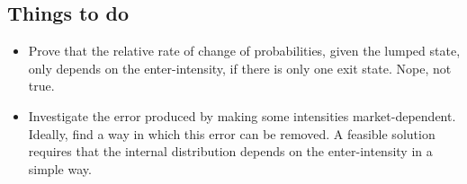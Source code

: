 \documentclass[12pt]{article}
\theoremstyle{my_thm}
\theoremstyle{my_def}
\theoremstyle{my_thm2}
\begin{document}
\subsection*{Things to do}
\begin{itemize}
\item Prove that the relative rate of change of probabilities, given the lumped state, only depends on the enter-intensity, if there is only one exit state. Nope, not true.
\item Investigate the error produced by making some intensities market-dependent. Ideally, find a way in which this error can be removed. A feasible solution requires that the internal distribution depends on the enter-intensity in a simple way. 
\end{itemize}





\newpage


\end{document}
